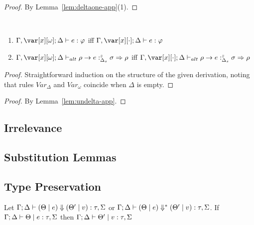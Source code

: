 \documentclass[acmsmall,review,anonymous,screen]{acmart}
\begin{document}
\deltaone*
\begin{proof}
By Lemma~\ref{lem:deltaone-app}(1).
\end{proof}

\begin{lemma}~\label{lem:undelta-app}
  \begin{enumerate}
    \item $\G,\xo; \D \vdash e : \vp$ iff $\G,\x[\cdot]; \D \vdash e :
      \vp$
    \item $\G,\xo;\D \vdash_{alt} \rho \rightarrow e
      :^z_{\Delta_s} \sigma \Rightarrow \rho$ iff
      $\G,\x[\cdot];\D \vdash_{alt} \rho \rightarrow e
   :^z_{\Delta_s} \sigma \Rightarrow \rho$
  \end{enumerate}
\end{lemma}
\begin{proof}
Straightforward induction on the structure of the given derivation,
noting that rules $\mathit{Var}_\Delta$ and $\mathit{Var}_\omega$
coincide when $\Delta$ is empty.
\end{proof}

\undelta*

\begin{proof}
By Lemma~\ref{lem:undelta-app}.
\end{proof}


\subsection{Irrelevance\label{sec:proof:irrelevance}}



\subsection{Substitution Lemmas\label{sec:proof:substitution-lemmas}}









\subsection{Type Preservation\label{sec:proof:type-preservation}}

% 
\begin{theorem}\label{thm:typepres}
  Let $\Gamma ; \Delta \vdash (\Theta \mid e) \Downarrow (\Theta' \mid v) :
  \tau , \Sigma$ or $\Gamma ; \Delta \vdash (\Theta \mid e) \Downarrow^* (\Theta' \mid v) :
  \tau , \Sigma$.
  If $\Gamma ; \Delta \vdash \Theta \mid e : \tau , \Sigma$ then $\Gamma ; \Delta \vdash \Theta' \mid v : \tau , \Sigma$
  
\end{theorem}
\end{document}

